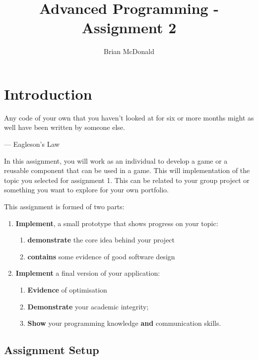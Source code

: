 \documentclass{../../fal_assignment}
\title{Advanced Programming - Assignment 2}
\author{Brian McDonald}
\begin{document}
\maketitle

\section*{Introduction}

\begin{marginquote}
Any code of your own that you haven't looked at for six or more months might as well have been written by someone else.

--- Eagleson's Law

\end{marginquote}

In this assignment, you will work as an individual to develop a game or a reusable component that can be used in a game. This will implementation of the topic you selected for assignment 1. This can be related to your group project or something you want to explore for your own portfolio.

This assignment is formed of two parts:

\begin{enumerate}[label=(\Alph*)]
    \item \textbf{Implement}, a small prototype that shows progress on your topic:
    	\begin{enumerate}[label=\roman*.]
    		\item \textbf{demonstrate} the core idea behind your project
			\item \textbf{contains} some evidence of good software design
		\end{enumerate}
    \item \textbf{Implement} a final version of your application:
    	\begin{enumerate}[label=\roman*.]
    		\item \textbf{Evidence} of optimisation
    		\item \textbf{Demonstrate} your academic integrity;
    		\item \textbf{Show} your programming knowledge \textbf{and} communication skills.
		\end{enumerate}
\end{enumerate}

\subsection*{Assignment Setup}
\end{document}
